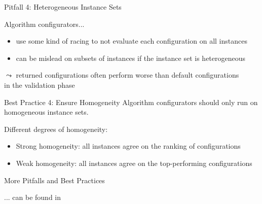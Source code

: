 \begin{frame}[c]{Pitfall 4: Heterogeneous Instance Sets}

Algorithm configurators...
\begin{itemize}
	\item use some kind of racing to not evaluate each configuration on all instances
	\pause
	\item can be mislead on subsets of instances if the instance set is heterogeneous
\end{itemize}

\pause
$\leadsto$ returned configurations often perform worse than default configurations\\ in the validation phase

\bigskip
\pause

\begin{block}{Best Practice 4: Ensure Homogeneity}
	Algorithm configurators should only run on homogeneous instance sets.
	
	Different degrees of homogeneity:
	\begin{itemize}
		\item Strong homogeneity: all instances agree on the ranking of configurations
		\item Weak homogeneity: all instances agree on the top-performing configurations
	\end{itemize}

\end{block}

\end{frame}

\begin{frame}[c]{More Pitfalls and Best Practices}

... can be found in 


\end{frame}



